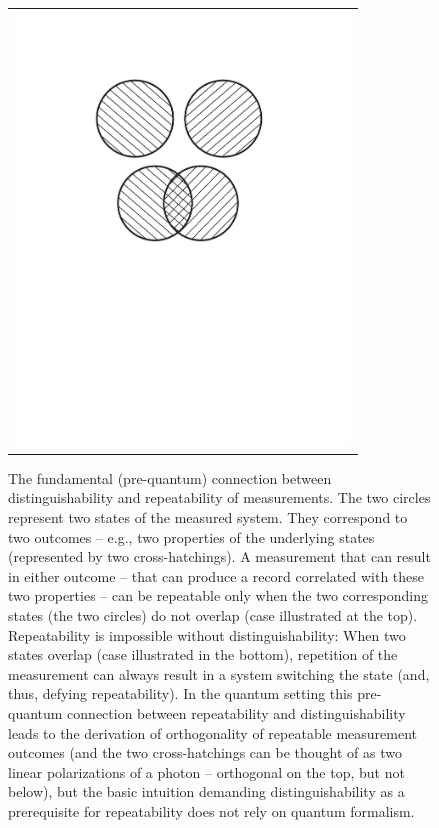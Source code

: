 \documentclass[aps,amsmath,amssymb,amsfonts,12pt]{revtex4-1}
\newcommand{\+}         {\dagger}
\begin{document}
{\begin{figure}[tb]
\begin{tabular}{l}
\vspace{-0.15in} 
\includegraphics[width=3.5in]{CircleDiaglinesC.pdf}\\
\end{tabular}
\caption{The fundamental (pre-quantum) connection between distinguishability and repeatability of measurements. The two circles represent two states of the measured system. They correspond to two outcomes -- e.g., two properties of the underlying states (represented by two cross-hatchings). A measurement that can result in either outcome -- that can produce a record correlated with these two properties -- can be repeatable only when the two corresponding states (the two circles) do not overlap (case illustrated at the top). Repeatability is impossible without distinguishability: When two states overlap (case illustrated in the bottom), repetition of the measurement can always result in a system switching the state (and, thus, defying repeatability).
In the quantum setting this pre-quantum connection between repeatability and distinguishability leads to the derivation of orthogonality of repeatable measurement outcomes (and the two cross-hatchings can be thought of as two linear polarizations of a photon -- orthogonal on the top, but not below), but the basic intuition demanding distinguishability as a prerequisite for repeatability does not rely on quantum formalism.}
\label{Distinguishability}
\end{figure}

}
\end{document}
